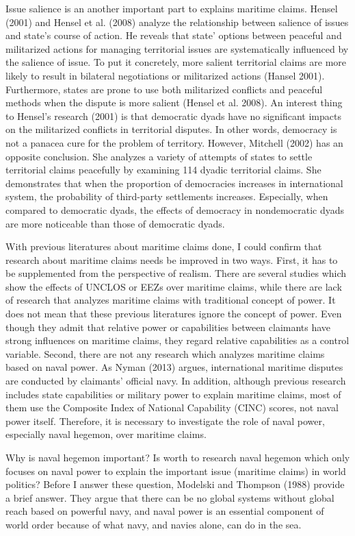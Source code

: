 \documentclass{article}
\begin{document}
Issue salience is an another important part to explains maritime claims. Hensel (2001) and Hensel et al. (2008) analyze the relationship between salience of issues and state’s course of action. He reveals that state’ options between peaceful and militarized actions for managing territorial issues are systematically influenced by the salience of issue. To put it concretely, more salient territorial claims are more likely to result in bilateral negotiations or militarized actions (Hansel 2001). Furthermore, states are prone to use both militarized conflicts and peaceful methods when the dispute is more salient (Hensel et al. 2008). An interest thing to Hensel’s research (2001) is that democratic dyads have no significant impacts on the militarized conflicts in territorial disputes. In other words, democracy is not a panacea cure for the problem of territory. However, Mitchell (2002) has an opposite conclusion. She analyzes a variety of attempts of states to settle territorial claims peacefully by examining 114 dyadic territorial claims. She demonstrates that when the proportion of democracies increases in international system, the probability of third-party settlements increases. Especially, when compared to democratic dyads, the effects of democracy in nondemocratic dyads are more noticeable than those of democratic dyads. 

With previous literatures about maritime claims done, I could confirm that research about maritime claims needs be improved in two ways. First, it has to be supplemented from the perspective of realism. There are several studies which show the effects of UNCLOS or EEZs over maritime claims, while there are lack of research that analyzes maritime claims with traditional concept of power. It does not mean that these previous literatures ignore the concept of power. Even though they admit that relative power or capabilities between claimants have strong influences on maritime claims, they regard relative capabilities as a control variable. Second, there are not any research which analyzes maritime claims based on naval power. As Nyman (2013) argues, international maritime disputes are conducted by claimants’ official navy. In addition, although previous research includes state capabilities or military power to explain maritime claims, most of them use the Composite Index of National Capability (CINC) scores, not naval power itself. Therefore, it is necessary to investigate the role of naval power, especially naval hegemon, over maritime claims. 

Why is naval hegemon important? Is worth to research naval hegemon which only focuses on naval power to explain the important issue (maritime claims) in world politics? Before I answer these question, Modelski and Thompson (1988) provide a brief answer. They argue that there can be no global systems without global reach based on powerful navy, and naval power is an essential component of world order because of what navy, and navies alone, can do in the sea.
\end{document}
